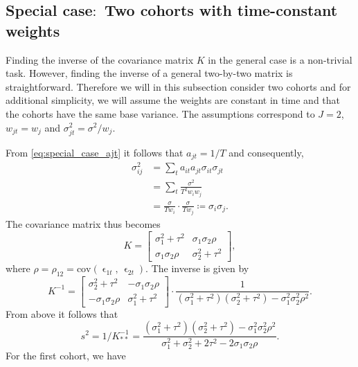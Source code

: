 \documentclass[11pt]{article}
\theoremstyle{definition}
\begin{document}
\subsection{Special case$\colon$ Two cohorts with time-constant weights}
Finding the inverse of the covariance matrix $ K$ in the general case is a non-trivial task. However, finding the inverse of a general two-by-two matrix is straightforward. Therefore we will in this subsection consider two cohorts and for additional simplicity, we will assume the weights are constant in time and that the cohorts have the same base variance. The assumptions correspond to $J=2$,  $w_{jt}=w_j$ and $\sigma_{jt}^2 = \sigma^2 / w_j$. 

From \eqref{eq:special_case_ajt} it follows that $a_{jt}=1/T$ and consequently,
\begin{equation*}
\begin{aligned}
    \sigma_{ij}^2 &= \sum_t a_{it}a_{jt}\sigma_{it}\sigma_{jt} \\
    &= \sum_t \frac{\sigma^2}{T^2w_iw_j} \\
    &= \frac{\sigma}{Tw_i} \cdot \frac{\sigma}{Tw_j} \coloneqq \sigma_i \sigma_j.
\end{aligned}
\end{equation*}
The covariance matrix thus becomes
\begin{equation*}
     K = \begin{bmatrix}\sigma_1^2 + \tau^2 & \sigma_1\sigma_2\rho \\
    \sigma_1\sigma_2\rho & \sigma_2^2 + \tau^2\end{bmatrix},
\end{equation*}
where $\rho = \rho_{12} = \text{cov}(\upvarepsilon_{1t},\, \upvarepsilon_{2t})$. The inverse is given by
\begin{equation*}
     K^{-1} = \begin{bmatrix}\sigma_2^2 + \tau^2 & -\sigma_1\sigma_2\rho \\
    -\sigma_1\sigma_2\rho & \sigma_1^2 + \tau^2\end{bmatrix} \cdot \frac{1}{(\sigma_1^2 + \tau^2)(\sigma_2^2 + \tau^2)-\sigma_1^2\sigma_2^2\rho^2}.
\end{equation*}
From above it follows that
\begin{equation*}
    s^2 = 1 /  K^{-1}_{\ast\ast} = \frac{(\sigma_1^2 + \tau^2)(\sigma_2^2 + \tau^2)-\sigma_1^2\sigma_2^2\rho^2}{\sigma_1^2+\sigma_2^2 + 2\tau^2 - 2\sigma_1\sigma_2\rho}.
\end{equation*}
For the first cohort, we have
\end{document}
